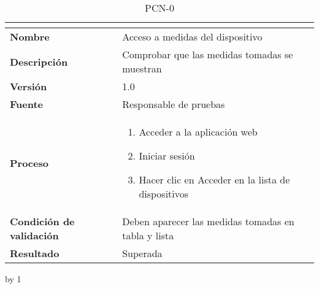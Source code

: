 \begin{table}[H]
	\caption{PCN-0\number\pcn}
	\begin{tabular}{|l|p{}|}
		\hline
		\multicolumn{2}{|c|}{\cellcolor[HTML]{BFBFBF}{\color[HTML]{000000} \textbf{PCN-0\number\pcn}}} \\ \hline
		\textbf{Nombre}                  & Acceso a medidas del dispositivo                    \\ \hline
		\textbf{Descripción}             & Comprobar que las medidas tomadas se muestran       \\ \hline
		\textbf{Versión}                 & 1.0                                                 \\ \hline
		\textbf{Fuente}                  & Responsable de pruebas                              \\ \hline
		\textbf{Proceso}                 & \begin{enumerate}
			\item Acceder a la aplicación web
			\item Iniciar sesión
			\item Hacer clic en Acceder en la lista de dispositivos
		\end{enumerate}                          \\ \hline		
		\textbf{Condición de validación} & Deben aparecer las medidas tomadas en tabla y lista \\ \hline
		\textbf{Resultado}               & Superada                                            \\ \hline
	\end{tabular}
\end{table}
\advance\pcn by 1
